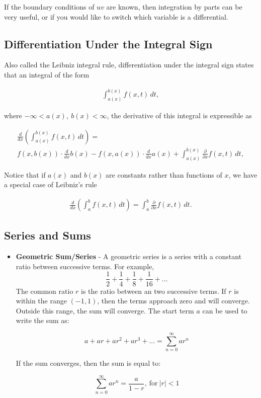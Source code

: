 \documentclass{article}
\numberwithin{theorem}{subsection}
\numberwithin{theorem}{subsubsection}
\theoremstyle{definition}
\numberwithin{definition}{subsection}
\numberwithin{definition}{subsubsection}
\begin{document}
If the boundary conditions of $uv$ are known, then integration by parts can be very useful, or if you would like to switch which variable is a differential.

\subsection{Differentiation Under the Integral Sign}
Also called the Leibniz integral rule, differentiation under the integral sign states that an integral of the form

\begin{gather*}
    \int_{a(x)}^{b(x)} f(x,t)\,dt,
\end{gather*}

\noindent where $-\infty < a(x),\ b(x) < \infty$, the derivative of this integral is expressible as

\begin{gather*}
    \frac{d}{dx} \left (\int_{a(x)}^{b(x)} f(x,t)\,dt \right ) = \\ f(x,b(x))\cdot \frac{d}{dx} b(x) - f(x,a(x))\cdot \frac{d}{dx} a(x) + \int_{a(x)}^{b(x)}\frac{\partial}{\partial x} f(x,t) \,dt,
\end{gather*}

Notice that if $a(x)$ and $b(x)$ are constants rather than functions of $x$, we have a special case of Leibniz's rule

\begin{gather*}
    \frac{d}{dx} \left(\int_{a}^{b} f(x,t)\,dt \right)= \int_{a}^{b}\frac{\partial}{\partial x} f(x,t) \,dt.
\end{gather*}

\subsection{Series and Sums}
\begin{itemize}
    \item \textbf{Geometric Sum/Series} - A geometric series is a series with a constant ratio between successive terms. For example,
    \begin{equation}
        \frac{1}{2} + \frac{1}{4} + \frac{1}{8} + \frac{1}{16} + ...
    \end{equation}
    The common ratio $r$ is the ratio between an two successive terms. If $r$ is within the range $(-1,1)$, then the terms approach zero and will converge. Outside this range, the sum will converge. The start term $a$ can be used to write the sum as:
    
    \begin{equation}
        a + ar + ar^2 + ar^3 + ... = \sum_{n=0}^{\infty} ar^n
    \end{equation}
    
    If the sum converges, then the sum is equal to:
    
    \begin{equation}
        \sum_{n=0}^{\infty} ar^n = \frac{a}{1 - r},\ \text{for}\ |r| < 1
    \end{equation}
\end{itemize}
\end{document}
